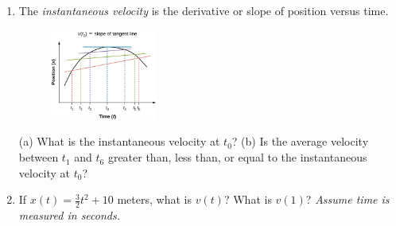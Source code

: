 \documentclass{article}
\begin{document}
\begin{enumerate}
\item The \textit{instantaneous velocity} is the derivative or slope of position versus time.
\begin{figure}[hb]
\centering
\includegraphics[width=0.33\textwidth]{figures/slope.jpeg}
\end{figure}
(a) What is the instantaneous velocity at $t_0$? (b) Is the average velocity between $t_1$ and $t_6$ greater than, less than, or equal to the instantaneous velocity at $t_0$?
\item If $x(t) = \frac{3}{2} t^2 + 10$ meters, what is $v(t)$?  What is $v(1)$?  \textit{Assume time is measured in seconds.}
\end{enumerate}
\end{document}
